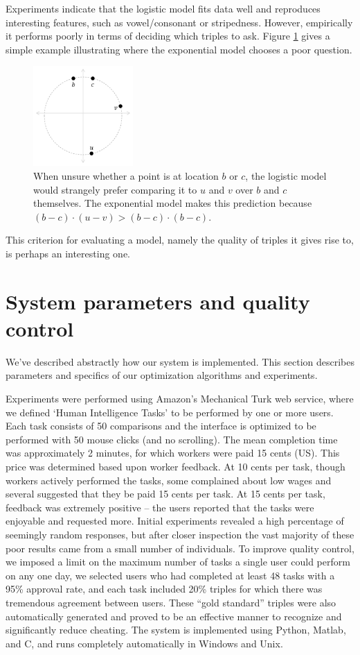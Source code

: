 \documentclass{article}
\begin{document}
Experiments indicate that the logistic model fits data well and reproduces interesting features, such as vowel/consonant or stripedness.  However, empirically it performs poorly in terms of deciding which triples to ask.  Figure \ref{fig:exp} gives a simple example illustrating where the exponential model chooses a poor question.


\begin{figure}
\centering
\includegraphics[width=1.5in]{expfig.pdf} \caption{\label{fig:exp} When unsure whether a point is at location $b$ or $c$, the logistic model would strangely prefer comparing it to $u$ and $v$ over $b$ and $c$ themselves.  The exponential model makes this prediction because $(b-c) \cdot (u-v) > (b-c)\cdot (b-c)$.}
\end{figure}

This criterion for evaluating a model, namely the quality of triples it gives rise to, is perhaps an interesting one.

\section{System parameters and quality control}\label{sec:params}
We've described abstractly how our system is implemented.  This
section describes parameters and specifics of our optimization
algorithms and experiments.

Experiments were performed using Amazon's Mechanical Turk web service,
where we defined `Human Intelligence Tasks' to be performed by one or
more users.  Each task consists of 50 comparisons and the interface is
optimized to be performed with 50 mouse clicks (and no scrolling).
The mean completion time was approximately 2 minutes, for which
workers were paid 15 cents (US).  This price was determined based upon
worker feedback.  At 10 cents per task, though workers actively
performed the tasks, some complained about low wages and several
suggested that they be paid 15 cents per task.  At 15 cents per task,
feedback was extremely positive -- the users reported that the tasks
were enjoyable and requested more.  Initial experiments revealed a
high percentage of seemingly random responses, but after closer
inspection the vast majority of these poor results came from a small
number of individuals.  To improve quality control, we imposed a limit
on the maximum number of tasks a single user could perform on any one
day, we selected users who had completed at least 48 tasks with a 95\%
approval rate, and each task included 20\% triples for which there was
tremendous agreement between users.  These ``gold standard'' triples
were also automatically generated and proved to be an effective manner
to recognize and significantly reduce cheating.  The system is
implemented using Python, Matlab, and C, and runs completely
automatically in Windows and Unix.
\end{document}
